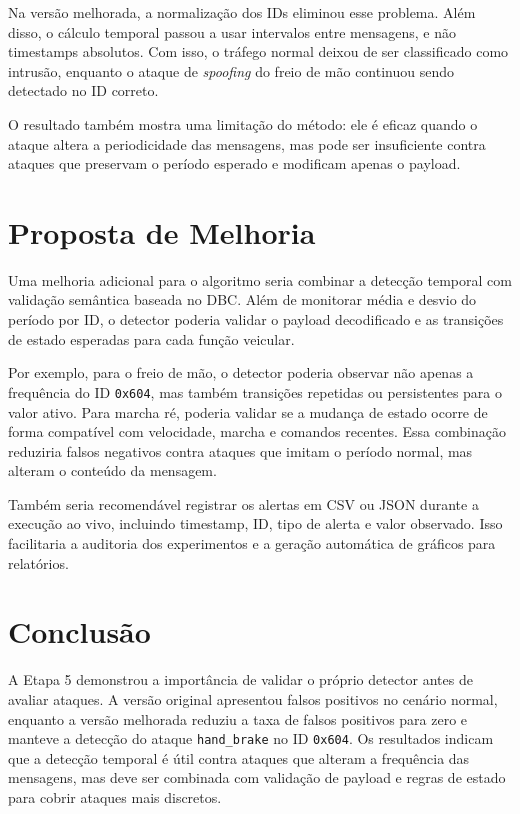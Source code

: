 \documentclass[12pt,a4paper]{article}
\begin{document}
Na vers\~ao melhorada, a normaliza\c{c}\~ao dos IDs eliminou esse problema. Al\'em disso,
o c\'alculo temporal passou a usar intervalos entre mensagens, e n\~ao timestamps
absolutos. Com isso, o tr\'afego normal deixou de ser classificado como intrus\~ao,
enquanto o ataque de \textit{spoofing} do freio de m\~ao continuou sendo detectado no
ID correto.

O resultado tamb\'em mostra uma limita\c{c}\~ao do m\'etodo: ele \'e eficaz quando o ataque
altera a periodicidade das mensagens, mas pode ser insuficiente contra ataques que
preservam o per\'iodo esperado e modificam apenas o payload.

\section{Proposta de Melhoria}

Uma melhoria adicional para o algoritmo seria combinar a detec\c{c}\~ao temporal com
valida\c{c}\~ao sem\^antica baseada no DBC. Al\'em de monitorar m\'edia e desvio do
per\'iodo por ID, o detector poderia validar o payload decodificado e as transi\c{c}\~oes
de estado esperadas para cada fun\c{c}\~ao veicular.

Por exemplo, para o freio de m\~ao, o detector poderia observar n\~ao apenas a
frequ\^encia do ID \texttt{0x604}, mas tamb\'em transi\c{c}\~oes repetidas ou persistentes
para o valor ativo. Para marcha r\'e, poderia validar se a mudan\c{c}a de estado ocorre
de forma compat\'ivel com velocidade, marcha e comandos recentes. Essa combina\c{c}\~ao
reduziria falsos negativos contra ataques que imitam o per\'iodo normal, mas alteram o
conte\'udo da mensagem.

Tamb\'em seria recomend\'avel registrar os alertas em CSV ou JSON durante a execu\c{c}\~ao
ao vivo, incluindo timestamp, ID, tipo de alerta e valor observado. Isso facilitaria a
auditoria dos experimentos e a gera\c{c}\~ao autom\'atica de gr\'aficos para relat\'orios.

\section{Conclus\~ao}

A Etapa 5 demonstrou a import\^ancia de validar o pr\'oprio detector antes de avaliar
ataques. A vers\~ao original apresentou falsos positivos no cen\'ario normal, enquanto a
vers\~ao melhorada reduziu a taxa de falsos positivos para zero e manteve a detec\c{c}\~ao
do ataque \texttt{hand\_brake} no ID \texttt{0x604}. Os resultados indicam que a
detec\c{c}\~ao temporal \'e \'util contra ataques que alteram a frequ\^encia das mensagens,
mas deve ser combinada com valida\c{c}\~ao de payload e regras de estado para cobrir
ataques mais discretos.
\end{document}
